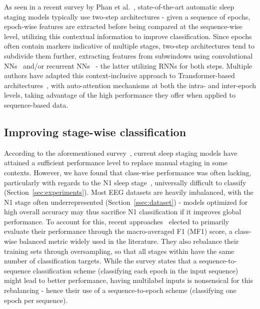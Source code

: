 \documentclass{article}
\begin{document}
As seen in a recent survey by Phan et al.~\cite{Phan_survey}, state-of-the-art automatic sleep staging models typically use two-step architectures -  given a sequence of epochs, epoch-wise features are extracted before being compared at the sequence-wise level, utilizing this contextual information to improve classification.
Since epochs often contain markers indicative of multiple stages, two-step architectures tend to subdivide them further, extracting features from subwindows using convolutional NNs~\cite{SEO2020102037} and/or recurrent NNs~\cite{phan2022xsleepnet,phan2023lseqsleepnet} - the latter utilizing RNNs for both steps.
Multiple authors have adapted this context-inclusive approach to Transformer-based architectures~\cite{zhu2020,phan2022sleeptransformer,CAIP_article}, with auto-attention mechanisms at both the intra- and inter-epoch levels, taking advantage of the high performance they offer when applied to sequence-based data.

\subsection{Improving stage-wise classification}
\label{ssec:N1_performance}

According to the aforementioned survey~\cite{Phan_survey}, current sleep staging models have attained a sufficient performance level to replace manual staging in some contexts. However, we have found that class-wise performance was often lacking, particularly with regards to the N1 sleep stage~\cite{berry2017aasm}, universally difficult to classify (Section~\ref{sec:experiments}).
Most EEG datasets are heavily imbalanced, with the N1 stage often underrepresented (Section~\ref{ssec:dataset}) - models optimized for high overall accuracy may thus sacrifice N1 classification if it improves global performance.
To account for this, recent approaches~\cite{paul,CAIP_article} elected to primarily evaluate their performance through the macro-averaged F1 (MF1) score, a class-wise balanced metric widely used in the literature. They also rebalance their training sets through oversampling, so that all stages within have the same number of classification targets.
While the survey states that a sequence-to-sequence classification scheme (classifying each epoch in the input sequence) might lead to better performance, having multilabel inputs is nonsensical for this rebalancing - hence their use of a sequence-to-epoch scheme (classifying one epoch per sequence).
\end{document}
